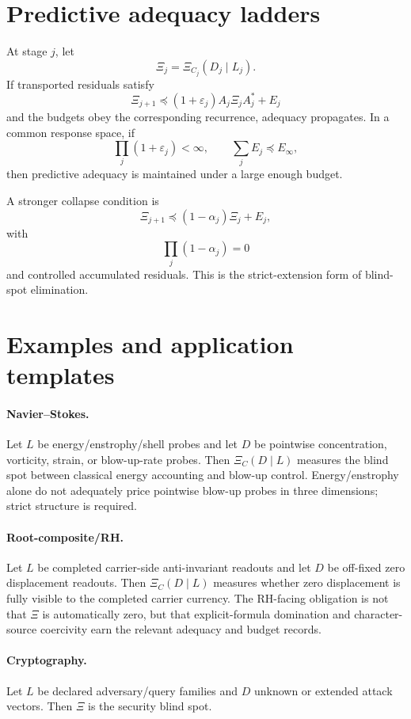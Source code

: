 \documentclass[11pt]{article}
\newcommand{\eps}{\varepsilon}
\begin{document}
\section{Predictive adequacy ladders}

At stage $j$, let
\[
\Xi_j=\Xi_{C_j}(D_j\mid L_j).
\]
If transported residuals satisfy
\[
\Xi_{j+1}\preceq (1+\eps_j)A_j\Xi_jA_j^*+E_j
\]
and the budgets obey the corresponding recurrence, adequacy propagates.  In a common response space, if
\[
\prod_j(1+\eps_j)<\infty,
\qquad
\sum_j E_j\preceq E_\infty,
\]
then predictive adequacy is maintained under a large enough budget.

A stronger collapse condition is
\[
\Xi_{j+1}\preceq (1-\alpha_j)\Xi_j+E_j,
\]
with
\[
\prod_j(1-\alpha_j)=0
\]
and controlled accumulated residuals.  This is the strict-extension form of blind-spot elimination.

\section{Examples and application templates}

\paragraph{Navier--Stokes.}
Let $L$ be energy/enstrophy/shell probes and let $D$ be pointwise concentration, vorticity, strain, or blow-up-rate probes.  Then $\Xi_C(D\mid L)$ measures the blind spot between classical energy accounting and blow-up control.  Energy/enstrophy alone do not adequately price pointwise blow-up probes in three dimensions; strict structure is required.

\paragraph{Root-composite/RH.}
Let $L$ be completed carrier-side anti-invariant readouts and let $D$ be off-fixed zero displacement readouts.  Then $\Xi_C(D\mid L)$ measures whether zero displacement is fully visible to the completed carrier currency.  The RH-facing obligation is not that $\Xi$ is automatically zero, but that explicit-formula domination and character-source coercivity earn the relevant adequacy and budget records.

\paragraph{Cryptography.}
Let $L$ be declared adversary/query families and $D$ unknown or extended attack vectors.  Then $\Xi$ is the security blind spot.
\end{document}
